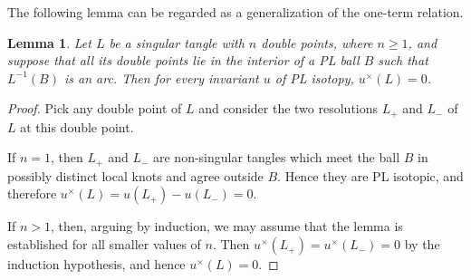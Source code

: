 \documentclass[a4paper,12pt,reqno,oneside]{amsart} %
\theoremstyle{plain}
\newtheorem{lemma}[theorem]{Lemma}
\theoremstyle{definition}
\theoremstyle{named}
\def\x{\times}
\renewcommand{\:}{\colon}
\begin{document}
The following lemma can be regarded as a generalization of the one-term relation.

\begin{lemma}\label{2.3} Let $L$ be a singular tangle with $n$ double points, where $n\ge 1$, and suppose 
that all its double points lie in the interior of a PL ball $B$ such that $L^{-1}(B)$ is an arc.
Then for every invariant $u$ of PL isotopy, $u^\x(L)=0$.
\end{lemma}

\begin{proof} Pick any double point of $L$ and consider the two resolutions $L_+$ and $L_-$ of $L$
at this double point.

If $n=1$, then $L_+$ and $L_-$ are non-singular tangles which meet the ball $B$ in possibly distinct local knots 
and agree outside $B$.
Hence they are PL isotopic, and therefore $u^\x(L)=u(L_+)-u(L_-)=0$.

If $n>1$, then, arguing by induction, we may assume that the lemma is established for all smaller values of $n$.
Then $u^\x(L_+)=u^\x(L_-)=0$ by the induction hypothesis, and hence $u^\x(L)=0$.
\end{proof}
\end{document}
